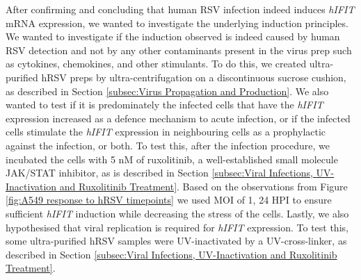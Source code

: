 After confirming and concluding that human RSV infection indeed induces \textit{hIFIT} mRNA expression, we wanted to investigate the underlying induction principles. We wanted to investigate if the induction observed is indeed caused by human RSV detection and not by any other contaminants present in the virus prep such as cytokines, chemokines, and other stimulants. To do this, we created ultra-purified hRSV preps by ultra-centrifugation on a discontinuous sucrose cushion, as described in Section \ref{subsec:Virus Propagation and Production}. We also wanted to test if it is predominately the infected cells that have the \textit{hIFIT} expression increased as a defence mechanism to acute infection, or if the infected cells stimulate the \textit{hIFIT} expression in neighbouring cells as a prophylactic against the infection, or both. To test this, after the infection procedure, we incubated the cells with 5 nM of ruxolitinib, a well-established small molecule JAK/STAT inhibitor, as is described in Section \ref{subsec:Viral Infections, UV-Inactivation and Ruxolitinib Treatment}. Based on the observations from Figure \ref{fig:A549 response to hRSV timepoints} we used MOI of 1, 24 HPI to ensure sufficient \textit{hIFIT} induction while decreasing the stress of the cells.  Lastly, we also hypothesised that viral replication is required for \textit{hIFIT} expression. To test this, some ultra-purified hRSV samples were UV-inactivated by a UV-cross-linker, as described in Section \ref{subsec:Viral Infections, UV-Inactivation and Ruxolitinib Treatment}.

